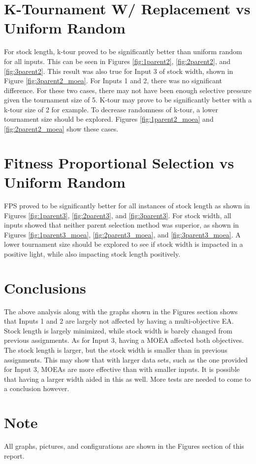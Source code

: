 \documentclass[times]{article}
\begin{document}
	\section{K-Tournament W/ Replacement vs Uniform Random}
	For stock length, k-tour proved to be significantly better than uniform random for all inputs. This can be seen in Figures \ref{fig:1parent2}, \ref{fig:2parent2}, and \ref{fig:3parent2}. This result was also true for Input 3 of stock width, shown in Figure \ref{fig:3parent2_moea}. For Inputs 1 and 2, there was no significant difference. For these two cases, there may not have been enough selective pressure given the tournament size of 5. K-tour may prove to be significantly better with a k-tour size of 2 for example. To decrease randomness of k-tour, a lower tournament size should be explored. Figures \ref{fig:1parent2_moea} and \ref{fig:2parent2_moea} show these cases.

	\section{Fitness Proportional Selection vs Uniform Random}
	FPS proved to be significantly better for all instances of stock length as shown in Figures \ref{fig:1parent3}, \ref{fig:2parent3}, and \ref{fig:3parent3}. For stock width, all inputs showed that neither parent selection method was superior, as shown in Figures \ref{fig:1parent3_moea}, \ref{fig:2parent3_moea}, and \ref{fig:3parent3_moea}. A lower tournament size should be explored to see if stock width is impacted in a positive light, while also impacting stock length positively.

	\section{Conclusions}
	The above analysis along with the graphs shown in the Figures section shows that Inputs 1 and 2 are largely not affected by having a multi-objective EA. Stock length is largely minimized, while stock width is barely changed from previous assignments. As for Input 3, having a MOEA affected both objectives. The stock length is larger, but the stock width is smaller than in previous assignments. This may show that with larger data sets, such as the one provided for Input 3, MOEAs are more effective than with smaller inputs. It is possible that having a larger width aided in this as well. More tests are needed to come to a conclusion however.

	\section{Note}
	All graphs, pictures, and configurations are shown in the Figures section of this report. 
\end{document}
